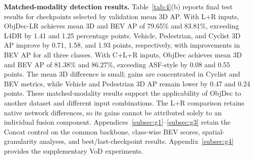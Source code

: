 \textbf{Matched-modality detection results.} Table~\ref{tab:4}(b) reports final test results for checkpoints selected by validation mean 3D AP. With L+R inputs, ObjDec-LR achieves mean 3D and BEV AP of 79.65\% and 83.81\%, exceeding L4DR by 1.41 and 1.25 percentage points. Vehicle, Pedestrian, and Cyclist 3D AP improve by 0.71, 1.58, and 1.93 points, respectively, with improvements in BEV AP for all three classes. With C+L+R inputs, ObjDec achieves mean 3D and BEV AP of 81.38\% and 86.27\%, exceeding ASF-style by 0.08 and 0.55 points. The mean 3D difference is small; gains are concentrated in Cyclist and BEV metrics, while Vehicle and Pedestrian 3D AP remain lower by 0.47 and 0.24 points. These matched-modality results support the applicability of ObjDec to another dataset and different input combinations. The L+R comparison retains native network differences, so its gains cannot be attributed solely to an individual fusion component. Appendices~\ref{subsec:g1}--\ref{subsec:g3} retain the Concat control on the common backbone, class-wise BEV scores, spatial-granularity analyses, and best/last-checkpoint results. Appendix~\ref{subsec:g4} provides the supplementary VoD experiments.












